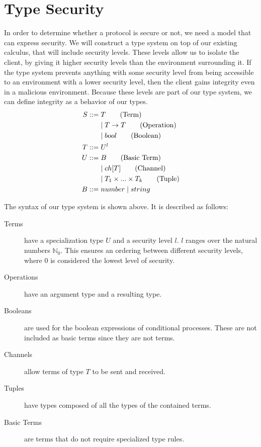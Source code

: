 \section{Type Security}\label{ch:type-security}
In order to determine whether a protocol is secure or not, we need a model that can express security.
We will construct a type system on top of our existing calculus, that will include security levels.
These levels allow us to isolate the client, by giving it higher security levels than the environment surrounding it.
If the type system prevents anything with some security level from being accessible to an environment with a lower security level, then the client gains integrity even in a malicious environment.
Because these levels are part of our type system, we can define integrity as a behavior of our types.
\begin{align*}
	S::=&\;T \tag{Term}\\
	&\mid T\rightarrow T \tag{Operation}\\
	&\mid bool \tag{Boolean}\\
	T::=&\;U^l\\
	U::=&\;B \tag{Basic Term}\\
	&\mid ch[T] \tag{Channel}\\
	&\mid T_1 \times...\times T_k \tag{Tuple}\\
	B::=&\;number 
	\mid string\\
\end{align*}

\noindent The syntax of our type system is shown above. It is described as follows:

\begin{description}
\item[Terms] have a specialization type $U$ and a security level $l$.
$l$ ranges over the natural numbers $\mathbb{N}_0$.
This ensures an ordering between different security levels, where $0$ is considered the lowest level of security.
\item[Operations] have an argument type and a resulting type.
\item[Booleans] are used for the boolean expressions of conditional processes.
These are not included as basic terms since they are not terms.
\item[Channels] allow terms of type $T$ to be sent and received.
\item[Tuples] have types composed of all the types of the contained terms.
\item[Basic Terms] are terms that do not require specialized type rules.
\end{description}

